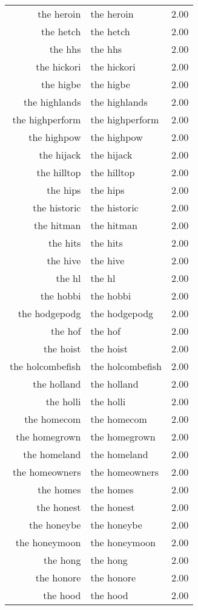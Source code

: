 \begin{table}[ht]
\begin{tabular}{rlr}
  the heroin & the heroin & 2.00 \\ 
  the hetch & the hetch & 2.00 \\ 
  the hhs & the hhs & 2.00 \\ 
  the hickori & the hickori & 2.00 \\ 
  the higbe & the higbe & 2.00 \\ 
  the highlands & the highlands & 2.00 \\ 
  the highperform & the highperform & 2.00 \\ 
  the highpow & the highpow & 2.00 \\ 
  the hijack & the hijack & 2.00 \\ 
  the hilltop & the hilltop & 2.00 \\ 
  the hips & the hips & 2.00 \\ 
  the historic & the historic & 2.00 \\ 
  the hitman & the hitman & 2.00 \\ 
  the hits & the hits & 2.00 \\ 
  the hive & the hive & 2.00 \\ 
  the hl & the hl & 2.00 \\ 
  the hobbi & the hobbi & 2.00 \\ 
  the hodgepodg & the hodgepodg & 2.00 \\ 
  the hof & the hof & 2.00 \\ 
  the hoist & the hoist & 2.00 \\ 
  the holcombefish & the holcombefish & 2.00 \\ 
  the holland & the holland & 2.00 \\ 
  the holli & the holli & 2.00 \\ 
  the homecom & the homecom & 2.00 \\ 
  the homegrown & the homegrown & 2.00 \\ 
  the homeland & the homeland & 2.00 \\ 
  the homeowners & the homeowners & 2.00 \\ 
  the homes & the homes & 2.00 \\ 
  the honest & the honest & 2.00 \\ 
  the honeybe & the honeybe & 2.00 \\ 
  the honeymoon & the honeymoon & 2.00 \\ 
  the hong & the hong & 2.00 \\ 
  the honore & the honore & 2.00 \\ 
  the hood & the hood & 2.00 \\ 

\end{tabular}
\end{table}
